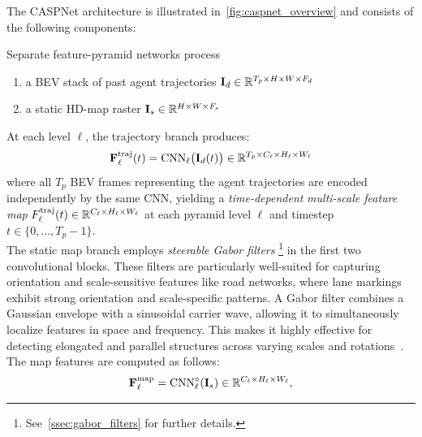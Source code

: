 The CASPNet architecture is illustrated in~\autoref{fig:caspnet_overview} and consists of the following components:
\begin{description}[leftmargin=1em,itemsep=2pt]
\item[Dual FPN encoders.] Separate feature-pyramid networks process
\begin{enumerate}[label=(\roman*)]
    \item a BEV stack of past agent trajectories \( \mathbf{I}_d\in\mathbb{R}^{T_p\times H\times W\times F_d} \)
    \item a static HD-map raster \( \mathbf{I}_s\in\mathbb{R}^{H\times W\times F_s} \)
\end{enumerate}

At each level \( \ell \), the trajectory branch produces:
\begin{equation}
\label{eq:fpn_traj}
\mathbf{F}^{\mathrm{traj}}_{\ell}(t) = \mathrm{CNN}_\ell\bigl(\mathbf{I}_{d}(t)\bigr) \in \mathbb{R}^{T_p \times C_\ell \times H_\ell \times W_\ell}
\end{equation}
where all \( T_p \) BEV frames representing the agent trajectories are encoded independently by the same CNN, yielding a \emph{time-dependent} \emph{multi-scale feature map} \( F^{\mathrm{traj}}_{\ell}(t) \in \mathbb{R}^{C_\ell \times H_\ell \times W_\ell} \) at each pyramid level \(\ell\) and timestep \( t \in \{0,\dots,T_p - 1\} \).\\

The static map branch employs \emph{steerable Gabor filters}%
\footnote{See~\autoref{ssec:gabor_filters} for further details.}
in the first two convolutional blocks. These filters are particularly well-suited for capturing orientation and scale-sensitive features like road networks, where lane markings exhibit strong orientation and scale-specific patterns. A Gabor filter combines a Gaussian envelope with a sinusoidal carrier wave, allowing it to simultaneously localize features in space and frequency. This makes it highly effective for detecting elongated and parallel structures across varying scales and rotations~\cite{steerableGaborFilters}.\\
The map features are computed as follows:
\begin{equation}
\label{eq:fpn_map}
\mathbf{F}_{\ell}^{\mathrm{map}}
= \mathrm{CNN}_\ell^{\circ}(\mathbf{I}_s) \in \mathbb{R}^{C_\ell \times H_\ell \times W_\ell},
\end{equation}


\end{description}
